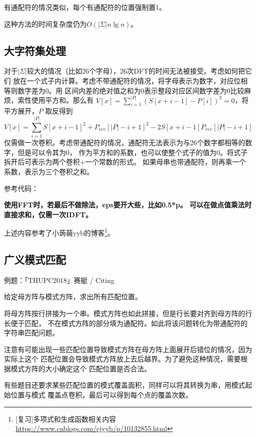 有通配符的情况类似，每个有通配符的位置强制置1。

这种方法的时间复杂度仍为$O(|\Sigma|n\lg n)$。
\subsection{大字符集处理}
对于$|\Sigma|$较大的情况（比如26个字母），26次DFT的时间无法被接受。考虑如何把它们
放在一个式子内计算。考虑不带通配符的情况，将字母表示为数字，对应位相等则数字差为0。用
区间内差的绝对值之和为0表示整段对应区间数字差为0比较麻烦，索性使用平方和。那么有
$V[x]=\displaystyle \sum_{i=1}^{|P|}{(S[x+i-1]-P[i])^2}=0$，将平方展开，$P$
取反得到
\begin{displaymath}
    V[x]=\displaystyle \sum_{i=1}^{|P|}{S[x+i-1]^2+P_{rev}[|P|-i+1]^2-2S[x+i-1]P_{rev}[|P|-i+1]}
\end{displaymath}
仅需做一次卷积。考虑带通配符的情况，通配符无法表示为与26个数字都相等的数字，但是可以令其为0，
作为平方和的系数，也可以使整个式子的值为0。将式子拆开后可表示为两个卷积+一个常数的形式。
如果母串也带通配符，则再乘一个系数，表示为三个卷积之和。

参考代码：


{\bfseries 使用FFT时，若最后不做除法，eps要开大些，比如0.5*p。
可以在做点值乘法时直接求和，仅需一次IDFT。}

上述内容参考了小蒟蒻yyb的博客\footnote{
    [复习]多项式和生成函数相关内容
    \url{https://www.cnblogs.com/cjyyb/p/10132855.html}
}。

\subsection{广义模式匹配}
例题：「THUPC2018」赛艇 / Citing

给定母方阵与模式方阵，求出所有匹配位置。

将母方阵按行拼接为一个串。模式方阵也如此拼接，但是行长要对齐到母方阵的行长便于匹配，
不在模式方阵的部分填为通配符。如此将该问题转化为带通配符的字符串匹配问题。

注意有可能出现一些匹配位置导致模式方阵在母方阵上面展开后错位的情况，因为实际上这个
匹配位置会导致模式方阵放上去后越界。为了避免这种情况，需要根据模式方阵的大小确定这个
匹配位置是否合法。

有些题目还要求某些匹配位置的模式覆盖面积，同样可以将其转换为串，用模式起始位置与模式
覆盖点卷积，最后可以得到每个点的覆盖次数。
